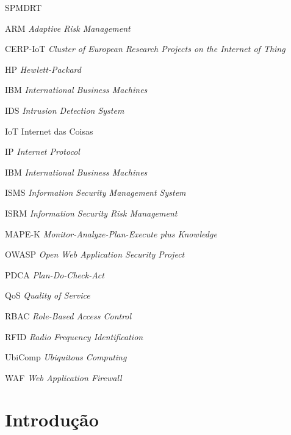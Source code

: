 \documentclass[tid,table]{texufpel} %
\begin{document}
\listoffigures

\listoftables

\begin{listofabbrv}{SPMDRT}
	\item[ARM] \textit{Adaptive Risk Management}
        \item[CERP-IoT] \textit{Cluster of European Research Projects on the Internet of Thing}
	\item[HP] \textit{Hewlett-Packard}
        \item[IBM] \textit{International Business Machines}
        \item[IDS] \textit{Intrusion Detection System}
	\item[IoT] Internet das Coisas
        \item[IP] \textit{Internet Protocol}
        \item[IBM] \textit{International Business Machines}
        \item[ISMS] \textit{Information Security Management System}
        \item[ISRM] \textit{Information Security Risk Management}
        \item[MAPE-K] \textit{Monitor-Analyze-Plan-Execute plus Knowledge}
        \item[OWASP] \textit{Open Web Application Security Project}
        \item[PDCA] \textit{Plan-Do-Check-Act}
        \item[QoS] \textit{Quality of Service}
        \item[RBAC] \textit{Role-Based Access Control}
        \item[RFID] \textit{Radio Frequency Identification}
	\item[UbiComp] \textit{Ubiquitous Computing}
        \item[WAF] \textit{Web Application Firewall} 
\end{listofabbrv}

\tableofcontents

\chapter{Introdução}
\end{document}
